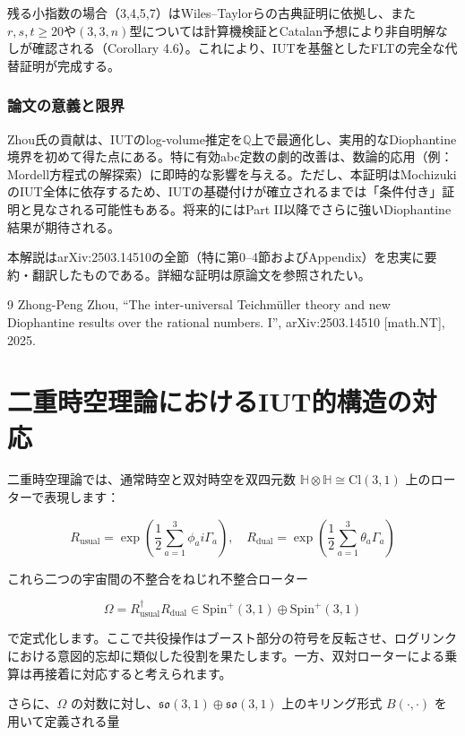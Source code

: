 \documentclass[a4paper,12pt,notitlepage]{jsreport}
\begin{document}
残る小指数の場合（3,4,5,7）はWiles–Taylorらの古典証明に依拠し、また\(r,s,t \geq 20\)や\((3,3,n)\)型については計算機検証とCatalan予想により非自明解なしが確認される（Corollary 4.6）。これにより、IUTを基盤としたFLTの完全な代替証明が完成する。

\subsubsection{論文の意義と限界}
Zhou氏の貢献は、IUTのlog-volume推定を\(\mathbb{Q}\)上で最適化し、実用的なDiophantine境界を初めて得た点にある。特に有効abc定数の劇的改善は、数論的応用（例：Mordell方程式の解探索）に即時的な影響を与える。ただし、本証明はMochizukiのIUT全体に依存するため、IUTの基礎付けが確立されるまでは「条件付き」証明と見なされる可能性もある。将来的にはPart II以降でさらに強いDiophantine結果が期待される。

本解説はarXiv:2503.14510の全節（特に第0–4節およびAppendix）を忠実に要約・翻訳したものである。詳細な証明は原論文を参照されたい。

\begin{thebibliography}{9}
Zhong-Peng Zhou, ``The inter-universal Teichmüller theory and new Diophantine results over the rational numbers. I'', arXiv:2503.14510 [math.NT], 2025.
\end{thebibliography}

\section{二重時空理論におけるIUT的構造の対応}

二重時空理論では、通常時空と双対時空を双四元数 $\mathbb{H} \otimes \mathbb{H} \cong \mathrm{Cl}(3,1)$ 上のローターで表現します：

\[
R_{\text{usual}} = \exp\left( \frac12 \sum_{a=1}^3 \phi_a i \Gamma_a \right), \quad
R_{\text{dual}} = \exp\left( \frac12 \sum_{a=1}^3 \theta_a \Gamma_a \right)
\]

これら二つの宇宙間の不整合をねじれ不整合ローター

\[
\Omega = R_{\text{usual}}^\dagger R_{\text{dual}} \in \mathrm{Spin}^+(3,1) \oplus \mathrm{Spin}^+(3,1)
\]

で定式化します。ここで共役操作はブースト部分の符号を反転させ、ログリンクにおける意図的忘却に類似した役割を果たします。一方、双対ローターによる乗算は再接着に対応すると考えられます。

さらに、$\Omega$ の対数に対し、$\mathfrak{so}(3,1) \oplus \mathfrak{so}(3,1)$ 上のキリング形式 $B(\cdot,\cdot)$ を用いて定義される量
\end{document}
